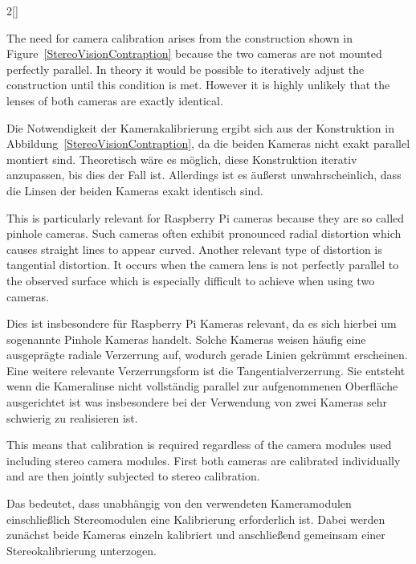 \begin{paracol}{2}[]
\colende

\renewcommand{\deutschertitel}{Kamerakalibrierung}
\renewcommand{\englischertitel}{Camera Calibration}
\makroabschnitt
\label{AbschnittStereoVisionKalibrierung}

The need for camera calibration arises from the construction shown in Figure~\ref{StereoVisionContraption} because the two cameras are not mounted perfectly parallel. In theory it would be possible to iteratively adjust the construction until this condition is met. However it is highly unlikely that the lenses of both cameras are exactly identical.

\colger

Die Notwendigkeit der Kamerakalibrierung ergibt sich aus der Konstruktion in Abbildung~\ref{StereoVisionContraption}, da die beiden Kameras nicht exakt parallel montiert sind. Theoretisch wäre es möglich, diese Konstruktion iterativ anzupassen, bis dies der Fall ist. Allerdings ist es äußerst unwahrscheinlich, dass die Linsen der beiden Kameras exakt identisch sind.

\coleng

This is particularly relevant for Raspberry Pi cameras because they are so called pinhole cameras. Such cameras often exhibit pronounced radial distortion which causes straight lines to appear curved. Another relevant type of distortion is tangential distortion. It occurs when the camera lens is not perfectly parallel to the observed surface which is especially difficult to achieve when using two cameras.

\colger

Dies ist insbesondere für Raspberry Pi Kameras relevant, da es sich hierbei um sogenannte Pinhole Kameras handelt. Solche Kameras weisen häufig eine ausgeprägte radiale Verzerrung auf, wodurch gerade Linien gekrümmt erscheinen. Eine weitere relevante Verzerrungsform ist die Tangentialverzerrung. Sie entsteht wenn die Kameralinse nicht vollständig parallel zur aufgenommenen Oberfläche ausgerichtet ist was insbesondere bei der Verwendung von zwei Kameras sehr schwierig zu realisieren ist.

\coleng

This means that calibration is required regardless of the camera modules used including stereo camera modules. First both cameras are calibrated individually and are then jointly subjected to stereo calibration.

\colger

Das bedeutet, dass unabhängig von den verwendeten Kameramodulen einschließlich Stereomodulen eine Kalibrierung erforderlich ist. Dabei werden zunächst beide Kameras einzeln kalibriert und anschließend gemeinsam einer Stereokalibrierung unterzogen.


\end{paracol}

